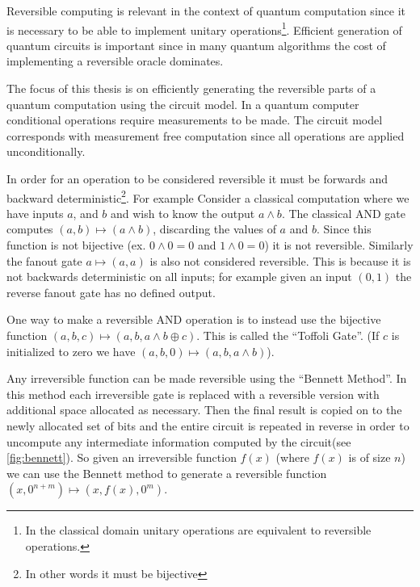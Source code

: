 Reversible computing is relevant in the context of quantum computation since it
is necessary to be able to implement unitary operations\footnote{In the
classical domain unitary operations are equivalent to reversible operations.}.
Efficient generation of quantum circuits is important since in many quantum
algorithms the cost of implementing a reversible oracle dominates.

The focus of this thesis is on efficiently generating the reversible parts of a
quantum computation using the circuit model. In a quantum computer conditional
operations require measurements to be made. The circuit model corresponds with
measurement free computation since all operations are applied unconditionally.

In order for an operation to be considered reversible it must be forwards and
backward deterministic\footnote{In other words it must be bijective}. For example 
Consider a classical computation where we have inputs $a$, and $b$ and wish to
know the output $a\land b$. The classical AND gate computes $(a,b)\mapsto
(a\land b)$, discarding the values of $a$ and $b$. Since this function is not
bijective (ex. $0\land 0 = 0$ and $1 \land 0 = 0$) it is not reversible.
Similarly the fanout gate $a\mapsto (a,a)$ is also not considered reversible.
This is because it is not backwards deterministic on all inputs; for example
given an input $(0,1)$ the reverse fanout gate has no defined output. 

One way to make a reversible AND operation
is to instead use the bijective function $(a,b,c) \mapsto (a,b,a\land b \oplus
c)$. This is called the ``Toffoli Gate''.  (If $c$ is initialized to zero we
have $(a,b,0) \mapsto (a,b,a\land b)$).

Any irreversible function can be made reversible using the ``Bennett
Method''\cite{Bennett:73}. In this method each irreversible gate is replaced
with a reversible version with additional space allocated as necessary. Then
the final result is copied on to the newly allocated set of bits and the entire
circuit is repeated in reverse in order to uncompute any intermediate
information computed by the circuit(see \cref{fig:bennett}). So given an irreversible
function $f(x)$ (where $f(x)$ is of size $n$) we can use the Bennett method to
generate a reversible function $(x,0^{n+m}) \mapsto (x,f(x),0^m)$.


